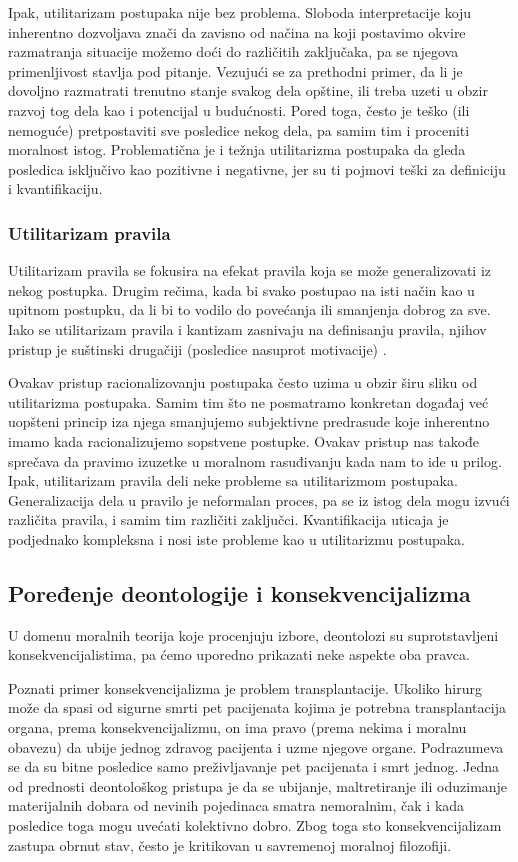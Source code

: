 \documentclass[a4paper]{article}
\begin{document}
Ipak, utilitarizam postupaka nije bez problema. Sloboda interpretacije koju inherentno dozvoljava znači da zavisno od načina na koji postavimo okvire razmatranja situacije možemo doći do različitih zaključaka, pa se njegova primenljivost stavlja pod pitanje. Vezujući se za prethodni primer, da li je dovoljno razmatrati trenutno stanje svakog dela opštine, ili treba uzeti u obzir razvoj tog dela kao i potencijal u budućnosti. Pored toga, često je teško (ili nemoguće) pretpostaviti sve posledice nekog dela, pa samim tim i proceniti moralnost istog. Problematična je i težnja utilitarizma postupaka da gleda posledica isključivo kao pozitivne i negativne, jer su ti pojmovi teški za definiciju i kvantifikaciju. 

\subsubsection{Utilitarizam pravila}
Utilitarizam pravila se fokusira na efekat pravila koja se može generalizovati iz nekog postupka. Drugim rečima, kada bi svako postupao na isti način kao u upitnom postupku, da li bi to vodilo do povećanja ili smanjenja dobrog za sve. Iako se utilitarizam pravila i kantizam zasnivaju na definisanju pravila, njihov pristup je suštinski drugačiji (posledice nasuprot motivacije) \cite{quinn-ethics}. 

Ovakav pristup racionalizovanju postupaka često uzima u obzir širu sliku od utilitarizma postupaka. Samim tim što ne posmatramo konkretan događaj već uopšteni princip iza njega smanjujemo subjektivne predrasude koje inherentno imamo kada racionalizujemo sopstvene postupke. Ovakav pristup nas takođe sprečava da pravimo izuzetke u moralnom rasuđivanju kada nam to ide u prilog. 
Ipak, utilitarizam pravila deli neke probleme sa utilitarizmom postupaka. Generalizacija dela u pravilo je neformalan proces, pa se iz istog dela mogu izvući različita pravila, i samim tim različiti zaključci. Kvantifikacija uticaja je podjednako kompleksna i nosi iste probleme kao u utilitarizmu postupaka. 

\subsection{Poređenje deontologije i konsekvencijalizma}
U domenu moralnih teorija koje procenjuju izbore, deontolozi su suprotstavljeni konsekvencijalistima, pa ćemo uporedno prikazati neke aspekte oba pravca.

Poznati primer konsekvencijalizma je problem transplantacije. Ukoliko hirurg može da spasi od sigurne smrti pet pacijenata kojima je potrebna transplantacija organa, prema konsekvencijalizmu, on ima pravo (prema nekima i moralnu obavezu) da ubije jednog zdravog pacijenta i uzme njegove organe. Podrazumeva se da su bitne posledice samo preživljavanje pet pacijenata i smrt jednog.
Jedna od prednosti deontološkog pristupa je da se ubijanje, maltretiranje ili oduzimanje materijalnih dobara od nevinih pojedinaca smatra nemoralnim, čak i kada posledice toga mogu uvećati kolektivno dobro. Zbog toga sto konsekvencijalizam zastupa obrnut stav, često je kritikovan u savremenoj moralnoj filozofiji.
\end{document}
